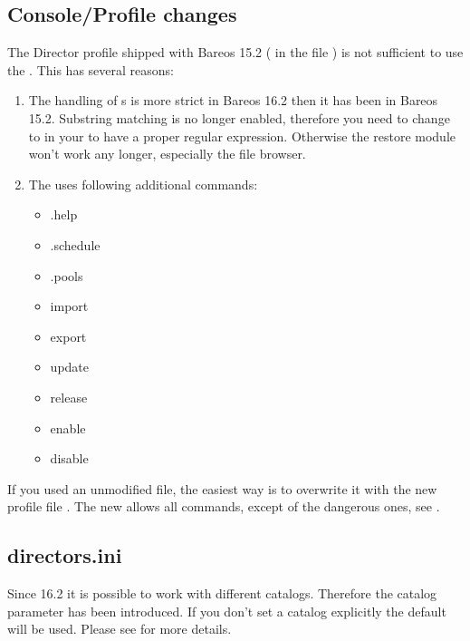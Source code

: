 \subsection{Console/Profile changes}

The \bareosWebui Director profile shipped with Bareos 15.2 ( in the file ) is not sufficient to use the .
This has several reasons:
\begin{enumerate}
  \item The handling of s is more strict in Bareos 16.2 then it has been in Bareos 15.2.
    Substring matching is no longer enabled, therefore you need to change  to 
    in your  to have a proper regular expression.
    Otherwise the restore module won't work any longer, especially the file browser.

  \item The  uses following additional commands:
\begin{itemize}
\item .help
\item .schedule
\item .pools
\item import
\item export
\item update
\item release
\item enable
\item disable
\end{itemize}

\end{enumerate}

If you used an unmodified  file,
the easiest way is to overwrite it with the new profile file .
The new  allows all commands, except of the dangerous ones, see .

\subsection{directors.ini}

Since 16.2 it is possible to work with different catalogs. Therefore the catalog parameter has been introduced. If you don't set a catalog explicitly the default  will be used. Please see  for more details.

